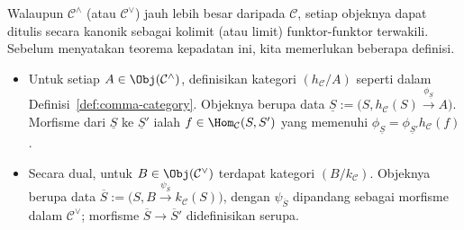 Walaupun $\mathcal{C}^\wedge$ (atau $\mathcal{C}^\vee$) jauh lebih besar
daripada $\mathcal{C}$, setiap objeknya dapat ditulis secara kanonik
sebagai kolimit (atau limit) funktor-funktor terwakili. Sebelum menyatakan
teorema kepadatan ini, kita memerlukan beberapa definisi.
\begin{itemize}
	\item Untuk setiap $A\in\Obj(\mathcal{C}^\wedge)$, definisikan kategori
	$(h_{\mathcal{C}}/A)$ seperti dalam Definisi~\ref{def:comma-category}.
	Objeknya berupa data
	$\underline S:=\bigl(S,h_{\mathcal{C}}(S)
	\xrightarrow{\phi_{\underline S}}A\bigr)$. Morfisme dari
	$\underline S$ ke $\underline S'$ ialah
	$f\in\Hom_{\mathcal{C}}(S,S')$ yang memenuhi
	$\phi_{\underline S}=\phi_{\underline S'}h_{\mathcal{C}}(f)$.

	\item Secara dual, untuk $B\in\Obj(\mathcal{C}^\vee)$ terdapat kategori
	$(B/k_{\mathcal{C}})$. Objeknya berupa data
	$\overline S:=\bigl(S,B\xrightarrow{\psi_{\overline S}}
	k_{\mathcal{C}}(S)\bigr)$, dengan $\psi_{\overline S}$ dipandang sebagai
	morfisme dalam $\mathcal{C}^\vee$; morfisme
	$\overline S\to\overline S'$ didefinisikan serupa.
\end{itemize}

